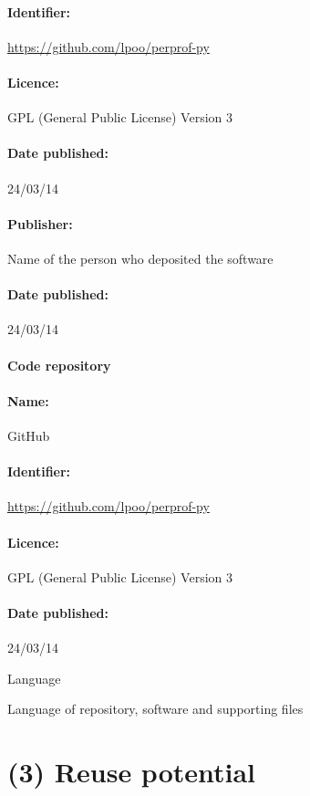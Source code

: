 \documentclass[10pt,a4paper]{article}
\begin{document}
    \paragraph{Identifier:} \url{https://github.com/lpoo/perprof-py}

    \paragraph{Licence:} GPL (General Public License) Version 3

    \paragraph{Date published:} 24/03/14

    \paragraph{Publisher:} Name of the person who deposited the software

    \paragraph{Date published:} 24/03/14

    \paragraph{Code repository}

    \paragraph{Name:} GitHub

    \paragraph{Identifier:} \url{https://github.com/lpoo/perprof-py}

    \paragraph{Licence:} GPL (General Public License) Version 3

    \paragraph{Date published:} 24/03/14

    Language

    Language of repository, software and supporting files

\section*{(3) Reuse potential}

\printbibliography
\end{document}
